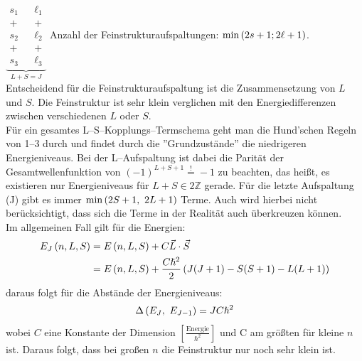 \documentclass[Ex4_Zusammenfassung.tex]{subfiles}
\begin{document}
$ \underbrace{	
		\begin{matrix}
			s_1 & & \ell_1\\
			+ & & + \\
			s_2 & & \ell_2\\
			+ & & + \\
			s_3 & & \ell_3
		\end{matrix}
		}_{L + S = J} $
\qquad Anzahl der Feinstrukturaufspaltungen: $\min \left( 2s+1; 2\ell+1 \right) $.\\

Entscheidend für die Feinstrukturaufspaltung ist die Zusammensetzung von $L$ und $S$. Die Feinstruktur ist sehr klein verglichen mit den Energiedifferenzen zwischen verschiedenen $L$ oder $S$.\\

Für ein gesamtes L--S--Kopplungs--Termschema geht man die Hund'schen Regeln von 1--3 durch und findet durch die ''Grundzustände'' die niedrigeren Energieniveaus. Bei der L--Aufspaltung ist dabei die Parität der Gesamtwellenfunktion von $(-1)^{L+S+1} \stackrel{!}{=} -1$ zu beachten, das heißt, es existieren nur Energieniveaus für $L+S \in 2\mathbb{Z}$ gerade. Für die letzte Aufspaltung (J) gibt es immer $\min \left( 2S+1,\ 2L+1 \right)$ Terme. Auch wird hierbei nicht berücksichtigt, dass sich die Terme in der Realität auch überkreuzen können. \\  

Im allgemeinen Fall gilt für die Energien: 
\begin{align}
	E_J\left( n,L,S \right) &= E\left( n,L,S \right) + C \vec{L}\cdot\vec{S} \\
	&= E\left( n,L,S \right) + \frac{C\hslash^2}{2}\left( J(J+1) - S(S+1) - L(L+1) \right)
\end{align}
daraus folgt für die Abstände der Energieniveaus:
\begin{equation}
	\Delta \left( E_J,\ E_{J-1} \right) = JC\hslash^2
\end{equation}
wobei $C$ eine Konstante der Dimension $\left[\frac{\text{Energie}}{\hslash^2} \right]$ und C am größten für kleine $n$ ist. Daraus folgt, dass bei großen $n$ die Feinstruktur nur noch sehr klein ist.
\end{document}
